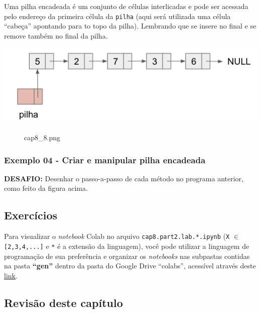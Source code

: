 \documentclass[12pt,a4paper]{article}
\begin{document}
Uma pilha encadeada é um conjunto de células interlicadas e pode ser
acessada pelo endereço da primeira célula da \texttt{pilha} (aqui será
utilizada uma célula ``cabeça'' apontando para to topo da pilha).
Lembrando que se insere no final e se remove também no final da pilha.

\includegraphics{"figs/cap8_8.png"}

    \begin{figure}
\centering
\caption{cap8\_8.png}
\end{figure}

    \hypertarget{exemplo-04---criar-e-manipular-pilha-encadeada}{%
\subsubsection{Exemplo 04 - Criar e manipular pilha
encadeada}\label{exemplo-04---criar-e-manipular-pilha-encadeada}}

    \textbf{DESAFIO:} Desenhar o passo-a-passo de cada método no programa
anterior, como feito da figura acima.

    \hypertarget{exercuxedcios}{%
\subsection{Exercícios}\label{exercuxedcios}}

    Para visualizar o \emph{notebook} Colab no arquivo
\texttt{cap8.part2.lab.*.ipynb} (\texttt{X} \(\in\)
\texttt{{[}2,3,4,...{]}} e \texttt{*} é a extensão da linguagem), você
pode utilizar a linguagem de programação de sua preferência e organizar
os \emph{notebooks} nas subpastas contidas na pasta \textbf{``gen''}
dentro da pasta do Google Drive ``colabs'', acessível através deste
\href{https://drive.google.com/drive/folders/1YlFwv8XYN7PYYf-HwDMlkxzbmXzJw9cM?usp=sharing}{link}.

    \hypertarget{revisuxe3o-deste-capuxedtulo}{%
\subsection{Revisão deste capítulo}\label{revisuxe3o-deste-capuxedtulo}}
\end{document}
